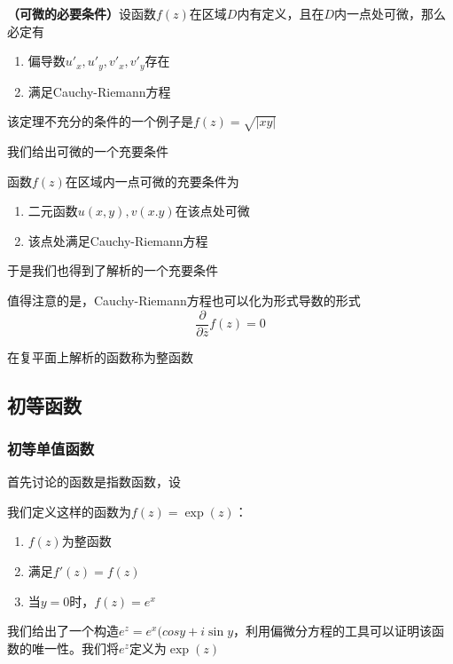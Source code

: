 \documentclass{ctexart}
\begin{document}
\begin{theorem}
    \textbf{（可微的必要条件）}设函数$f(z)$在区域$D$内有定义，且在$D$内一点处可微，那么必定有
    \begin{enumerate}
        \item 偏导数$u'_x,u'_y,v'_x,v'_y$存在
        \item 满足Cauchy-Riemann方程
    \end{enumerate}
\end{theorem}

该定理不充分的条件的一个例子是$f(z) = \sqrt{|xy|}$

我们给出可微的一个充要条件
\begin{theorem}
    函数$f(z)$在区域内一点可微的充要条件为
    \begin{enumerate}
        \item 二元函数$u(x,y),v(x.y)$在该点处可微
        \item 该点处满足Cauchy-Riemann方程
    \end{enumerate}
\end{theorem}

于是我们也得到了解析的一个充要条件

值得注意的是，Cauchy-Riemann方程也可以化为形式导数的形式
\begin{equation*}
    \frac{\partial }{\partial \overline{z}} f(z) = 0
\end{equation*}

\begin{definition}
    在复平面上解析的函数称为整函数
\end{definition}

\subsection{初等函数}

\subsubsection{初等单值函数}

首先讨论的函数是指数函数，设

我们定义这样的函数为$f(z)= \exp (z)$：
\begin{enumerate}
    \item $f(z)$为整函数
    \item 满足$f'(z) = f(z)$
    \item 当$y = 0$时，$f(z) = e^x$
\end{enumerate}
我们给出了一个构造$e^z = e^x(cos y + i \sin y$，利用偏微分方程的工具可以证明该函数的唯一性。我们将$e^z$定义为$\exp(z)$
\end{document}
